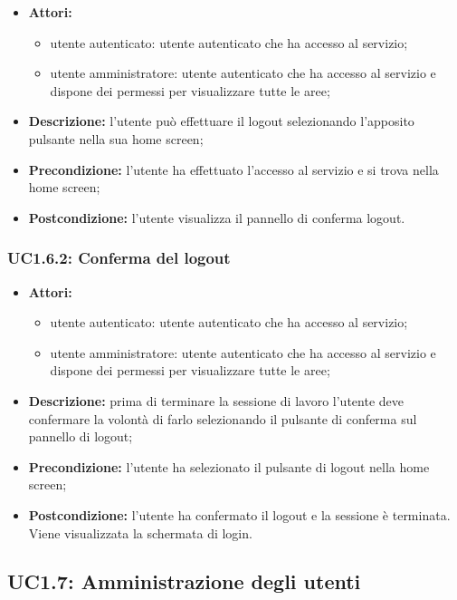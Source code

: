 \begin{itemize}
   	\item \textbf{Attori:}
    \begin{itemize}
    	\item utente autenticato: utente autenticato che ha accesso al servizio;
    	\item utente amministratore: utente autenticato che ha accesso al servizio e dispone dei permessi per visualizzare tutte le aree;
	\end{itemize}
    \item \textbf{Descrizione:} l'utente può effettuare il logout selezionando l'apposito pulsante nella sua home screen;
    \item \textbf{Precondizione:} l'utente ha effettuato l'accesso al servizio e si trova nella home screen;
    \item \textbf{Postcondizione:} l'utente visualizza il pannello di conferma logout.
\end{itemize}

\subsubsection{UC1.6.2: Conferma del logout}

\begin{itemize}
   	\item \textbf{Attori:}
    \begin{itemize}
    	\item utente autenticato: utente autenticato che ha accesso al servizio;
    	\item utente amministratore: utente autenticato che ha accesso al servizio e dispone dei permessi per visualizzare tutte le aree;
	\end{itemize}
    \item \textbf{Descrizione:} prima di terminare la sessione di lavoro l'utente deve confermare la volontà di farlo selezionando il pulsante di conferma sul pannello di logout;
    \item \textbf{Precondizione:} l'utente ha selezionato il pulsante di logout nella home screen;
    \item \textbf{Postcondizione:} l'utente ha confermato il logout e la sessione è terminata. Viene visualizzata la schermata di login.
\end{itemize}

\pagebreak


\subsection{UC1.7: Amministrazione degli utenti}

